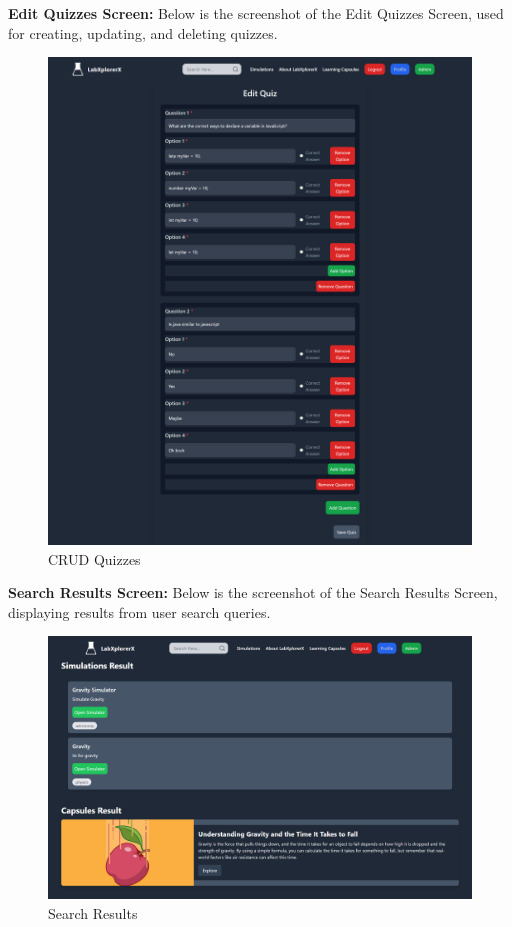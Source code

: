 \textbf{Edit Quizzes Screen:} Below is the screenshot of the Edit Quizzes Screen, used for creating, updating, and deleting quizzes.
\begin{figure}[H]
    \centering
    \includegraphics[width = 16cm]{Diagrams/output/edit_quiz.png}
    \caption{CRUD Quizzes}
\end{figure}
\newpage

\textbf{Search Results Screen:} Below is the screenshot of the Search Results Screen, displaying results from user search queries.
\begin{figure}[H]
    \centering
    \includegraphics[width = 16cm]{Diagrams/output/search_results.png}
    \caption{Search Results}
\end{figure}
\newpage

